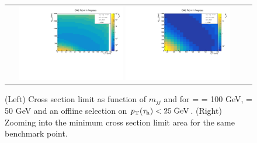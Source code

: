 \begin{figure}[tbh!]
	\centering
	\begin{tabular}{cc}
		\includegraphics[width=0.45\textwidth]{analysis/pics/JetInvMass_vs_MET_xsec_chi100_lsp050_taupt25.pdf}
		\includegraphics[width=0.45\textwidth]{analysis/pics/JetInvMass_vs_MET_xsec_chi100_lsp050_taupt25_zoom.pdf} 		
	\end{tabular}
	\caption{(Left) Cross section limit as function of $m_{jj}$ and \met for \charginopm = \neutralinotwo = 100 GeV, \neutralinoone = 50 GeV and an offline selection on $p_{\text{T}}(\tau_{\text{h}}) <  25\;\text{Ge}\kern-0.06667em\text{V}$. (Right) Zooming into the minimum cross section limit area for the same benchmark point.}
	\label{fig::JetInvMass_vs_MET_xsec_chi100_lsp050_taupt25}
\end{figure}

